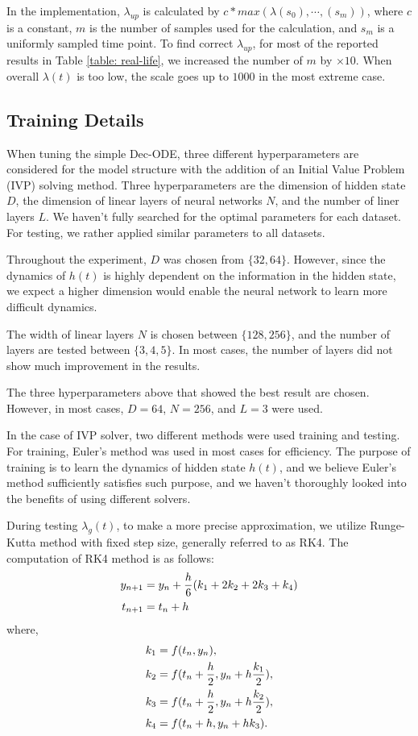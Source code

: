 In the implementation, $\lambda_{up}$ is calculated by $c * max(\lambda(s_0), \cdots, (s_m))$, where $c$ is a constant, $m$ is the number of samples used for the calculation, and $s_m$ is a uniformly sampled time point.
To find correct $\lambda_{up}$, for most of the reported results in Table \ref{table: real-life}, we increased the number of $m$ by $\times10$.
When overall $\lambda(t)$ is too low, the scale goes up to $1000$ in the most extreme case.

\subsection{Training Details}
When tuning the simple Dec-ODE, three different hyperparameters are considered for the model structure with the addition of an Initial Value Problem (IVP) solving method.
Three hyperparameters are the dimension of hidden state $D$, the dimension of linear layers of neural networks $N$, and the number of liner layers $L$.
We haven't fully searched for the optimal parameters for each dataset. For testing, we rather applied similar parameters to all datasets.

Throughout the experiment, $D$ was chosen from $\{32, 64\}$. However, since the dynamics of $h(t)$ is highly dependent on the information in the hidden state, we expect a higher dimension would enable the neural network to learn more difficult dynamics.

The width of linear layers $N$ is chosen between $\{128, 256\}$, and the number of layers are tested between $\{3, 4, 5\}$. In most cases, the number of layers did not show much improvement in the results.

The three hyperparameters above that showed the best result are chosen. However, in most cases, $D=64$, $N=256$, and $L=3$ were used.

In the case of IVP solver, two different methods were used training and testing. For training, Euler's method was used in most cases for efficiency. The purpose of training is to learn the dynamics of hidden state $h(t)$, and we believe Euler's method sufficiently satisfies such purpose, and we haven't thoroughly looked into the benefits of using different solvers.

During testing $\lambda_g(t)$, to make a more precise approximation, we utilize Runge-Kutta method with fixed step size, generally referred to as RK4. The computation of RK4 method is as follows:
\begin{align}
    y_{n+1} &= y_n + {h\over6}(k_1 + 2k_2 + 2k_3 + k_4)\\
    t_{n+1} &= t_n + h
\end{align}
where,
\begin{align}
k_1 &= f(t_n, y_n), \\
k_2 &= f(t_n + {h \over 2}, y_n + h {k_1 \over 2}),\\
k_3 &= f(t_n + {h \over 2}, y_n + h {k_2 \over 2}),\\
k_4 &= f(t_n + h, y_n + hk_3).
\end{align}

